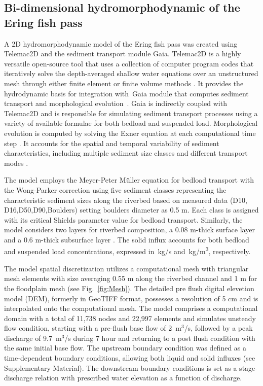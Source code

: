 \documentclass[draft,linenumbers,onecolumn]{agujournal2019} %
\begin{document}
\subsection{Bi-dimensional hydromorphodynamic of the Ering fish pass}
\label{sec:Sec2.3}
A 2D hydromorphodynamic model of the Ering fish pass was created using Telemac2D and the sediment transport module Gaia. Telemac2D is a  highly versatile open-source tool that uses a collection of computer program codes that iteratively solve the depth-averaged shallow water equations \cite{saint-venant1871theorie} over an unstructured mesh through either finite element or finite volume methods \cite{galland1991telemac,hervouet2007hydrodynamics}. It provides the hydrodynamic basis for integration with Gaia module that computes sediment transport and morphological evolution \cite{tassi2023gaia}. Gaia is indirectly coupled with Telemac2D and is responsible for simulating sediment transport processes using a variety of available formulae for both bedload and suspended load. Morphological evolution is computed by solving the Exner equation at each computational time step \cite{audouin2020introducing}. It accounts for the spatial and temporal variability of sediment characteristics, including multiple sediment size classes and different transport modes \cite{exner1925uber,tassi2023gaia}. 

The model employs the Meyer-Peter Müller equation for bedload transport with the Wong-Parker correction \cite{wong2006reanalysis} using five sediment classes representing the characteristic sediment sizes along the riverbed based on measured data (D10, D16,D50,D90,Boulders) setting boulders diameter as 0.5 m. Each class is assigned with its critical Shields parameter value for bedload transport. Similarly, the model considers two layers for riverbed composition, a 0.08 m-thick surface layer and a 0.6 m-thick subsurface layer \cite{scolari2025hydromorphodynamic}. The solid influx accounts for both bedload and suspended load concentrations, expressed in~kg/s and~kg/m\textsuperscript{3}, respectively.

The model spatial discretization utilizes a computational mesh with triangular mesh elements with size averaging 0.55 m along the riverbed channel and 1 m for the floodplain mesh (see Fig.~\ref{fig:Mesh}). The detailed pre flush digital elevetion model (DEM), formerly in GeoTIFF format, possesses a resolution of 5 cm and is interpolated onto the computational mesh. The model comprises a computational domain with a total of 11,738 nodes and 22,997 elements and simulates unsteady flow condition, starting with a pre-flush base flow of 2~m$^3$/s, followed by a peak discharge of 9.7~m$^3$/s during 7 hour and returning to a post flush condition with the same initial base flow. The upstream boundary condition was defined as a time-dependent boundary conditions, allowing both liquid and solid influxes (see Supplementary Material). 
The downstream boundary conditions is set as a stage-discharge relation with prescribed water elevation as a function of discharge. 
\end{document}
